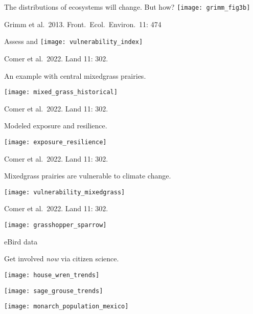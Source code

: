 \documentclass[t]{beamer}
\begin{document}
\begin{frame}{The distributions of ecosystems will change. But how?}
\texttt{[image: grimm\_fig3b]}

\tinyfill Grimm et al.\ 2013. Front.\ Ecol.\ Environ.\ 11: 474
\end{frame}

\begin{frame}{Assess  and }
\centering
\texttt{[image: vulnerability\_index]}

\tinyfill Comer et al.\ 2022. Land 11: 302.
\end{frame}

\begin{frame}{An example with central mixedgrass prairies.}

\texttt{[image: mixed\_grass\_historical]}


\tinyfill Comer et al.\ 2022. Land 11: 302.
\end{frame}

\begin{frame}{Modeled exposure and resilience.}

\texttt{[image: exposure\_resilience]}

\tinyfill Comer et al.\ 2022. Land 11: 302.
\end{frame}

\begin{frame}{Mixedgrass prairies are vulnerable to climate change.}

\centering
\texttt{[image: vulnerability\_mixedgrass]}

\tinyfill Comer et al.\ 2022. Land 11: 302.
\end{frame}

\begin{frame}

\texttt{[image: grasshopper\_sparrow]}

\tinyfill eBird data
\end{frame}

{
\begin{frame}[b,plain]{Get involved \textit{now} via citizen science.}
\end{frame}
}


\begin{frame}
\texttt{[image: house\_wren\_trends]}
\end{frame}


\begin{frame}
\texttt{[image: sage\_grouse\_trends]}
\end{frame}

\begin{frame}
\texttt{[image: monarch\_population\_mexico]}
\end{frame}
\end{document}
